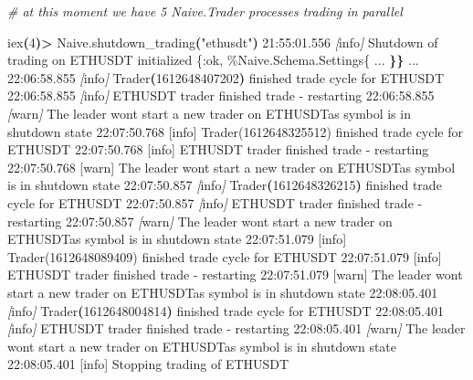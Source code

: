 \documentclass[
  oneside]{book}
\newenvironment{Shaded}{\begin{snugshade}}{\end{snugshade}}
\newcommand{\AttributeTok}[1]{\textcolor[rgb]{0.13,0.29,0.53}{#1}}
\newcommand{\CommentTok}[1]{\textcolor[rgb]{0.56,0.35,0.01}{\textit{#1}}}
\newcommand{\ErrorTok}[1]{\textcolor[rgb]{0.64,0.00,0.00}{\textbf{#1}}}
\newcommand{\ExtensionTok}[1]{#1}
\newcommand{\KeywordTok}[1]{\textcolor[rgb]{0.13,0.29,0.53}{\textbf{#1}}}
\newcommand{\NormalTok}[1]{#1}
\newcommand{\OperatorTok}[1]{\textcolor[rgb]{0.81,0.36,0.00}{\textbf{#1}}}
\newcommand{\PreprocessorTok}[1]{\textcolor[rgb]{0.56,0.35,0.01}{\textit{#1}}}
\newcommand{\SpecialStringTok}[1]{\textcolor[rgb]{0.31,0.60,0.02}{#1}}
\newcommand{\StringTok}[1]{\textcolor[rgb]{0.31,0.60,0.02}{#1}}
\begin{document}
\begin{Shaded}
\begin{Highlighting}[]
\CommentTok{\# at this moment we have 5 \textasciigrave{}Naive.Trader\textasciigrave{} processes trading in parallel}

\ExtensionTok{iex}\ErrorTok{(}\ExtensionTok{4}\KeywordTok{)}\OperatorTok{\textgreater{}}\NormalTok{ Naive.shutdown\_trading}\KeywordTok{(}\StringTok{"ethusdt"}\KeywordTok{)}
\ExtensionTok{21:55:01.556} \PreprocessorTok{[}\SpecialStringTok{info}\PreprocessorTok{]}\NormalTok{  Shutdown of trading on ETHUSDT initialized}
\ExtensionTok{\{:ok,}
 \ExtensionTok{\%Naive.Schema.Settings\{}
     \ExtensionTok{...}
 \ErrorTok{\}\}}
\ExtensionTok{...}
\ExtensionTok{22:06:58.855} \PreprocessorTok{[}\SpecialStringTok{info}\PreprocessorTok{]}\NormalTok{  Trader}\ErrorTok{(}\ExtensionTok{1612648407202}\KeywordTok{)} \ExtensionTok{finished}\NormalTok{ trade cycle for ETHUSDT}
\ExtensionTok{22:06:58.855} \PreprocessorTok{[}\SpecialStringTok{info}\PreprocessorTok{]}\NormalTok{  ETHUSDT trader finished trade }\AttributeTok{{-}}\NormalTok{ restarting}
\ExtensionTok{22:06:58.855} \PreprocessorTok{[}\SpecialStringTok{warn}\PreprocessorTok{]}\NormalTok{  The leader won}\StringTok{\textquotesingle{}t start a new trader on ETHUSDTas symbol is in}
\StringTok{shutdown state}
\StringTok{22:07:50.768 [info]  Trader(1612648325512) finished trade cycle for ETHUSDT}
\StringTok{22:07:50.768 [info]  ETHUSDT trader finished trade {-} restarting}
\StringTok{22:07:50.768 [warn]  The leader won\textquotesingle{}}\NormalTok{t start a new trader on ETHUSDTas symbol is in}
\ExtensionTok{shutdown}\NormalTok{ state}
\ExtensionTok{22:07:50.857} \PreprocessorTok{[}\SpecialStringTok{info}\PreprocessorTok{]}\NormalTok{  Trader}\ErrorTok{(}\ExtensionTok{1612648326215}\KeywordTok{)} \ExtensionTok{finished}\NormalTok{ trade cycle for ETHUSDT}
\ExtensionTok{22:07:50.857} \PreprocessorTok{[}\SpecialStringTok{info}\PreprocessorTok{]}\NormalTok{  ETHUSDT trader finished trade }\AttributeTok{{-}}\NormalTok{ restarting}
\ExtensionTok{22:07:50.857} \PreprocessorTok{[}\SpecialStringTok{warn}\PreprocessorTok{]}\NormalTok{  The leader won}\StringTok{\textquotesingle{}t start a new trader on ETHUSDTas symbol is in}
\StringTok{shutdown state}
\StringTok{22:07:51.079 [info]  Trader(1612648089409) finished trade cycle for ETHUSDT}
\StringTok{22:07:51.079 [info]  ETHUSDT trader finished trade {-} restarting}
\StringTok{22:07:51.079 [warn]  The leader won\textquotesingle{}}\NormalTok{t start a new trader on ETHUSDTas symbol is in}
\ExtensionTok{shutdown}\NormalTok{ state}
\ExtensionTok{22:08:05.401} \PreprocessorTok{[}\SpecialStringTok{info}\PreprocessorTok{]}\NormalTok{  Trader}\ErrorTok{(}\ExtensionTok{1612648004814}\KeywordTok{)} \ExtensionTok{finished}\NormalTok{ trade cycle for ETHUSDT}
\ExtensionTok{22:08:05.401} \PreprocessorTok{[}\SpecialStringTok{info}\PreprocessorTok{]}\NormalTok{  ETHUSDT trader finished trade }\AttributeTok{{-}}\NormalTok{ restarting}
\ExtensionTok{22:08:05.401} \PreprocessorTok{[}\SpecialStringTok{warn}\PreprocessorTok{]}\NormalTok{  The leader won}\StringTok{\textquotesingle{}t start a new trader on ETHUSDTas symbol is in}
\StringTok{shutdown state}
\StringTok{22:08:05.401 [info]  Stopping trading of ETHUSDT}
\end{Highlighting}
\end{Shaded}
\end{document}
